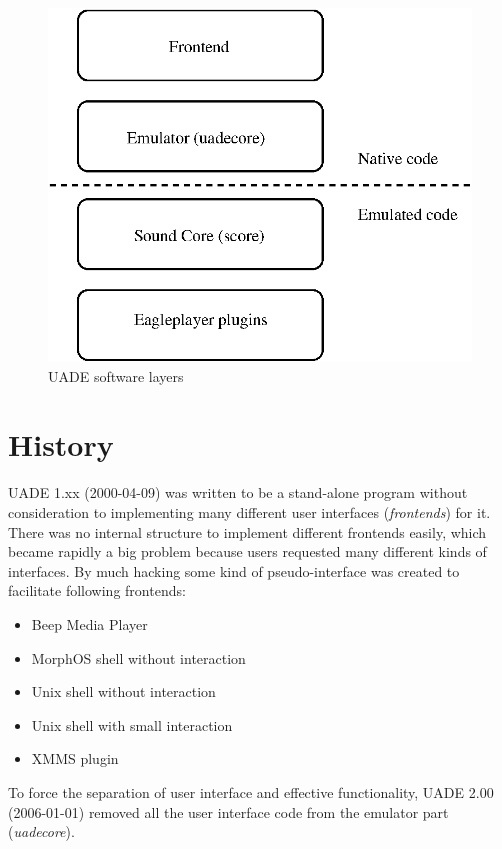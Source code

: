 \documentclass{article}
\begin{document}
\begin{figure}
\centering
\includegraphics[scale=0.5]{layers.eps}
\caption{UADE software layers}
\label{fig:layers}
\end{figure}

\section{History}

UADE 1.xx (2000-04-09) was written to be a stand-alone program without
consideration to implementing many different user interfaces
(\emph{frontends}) for it. There was
no internal structure to implement different frontends easily, which
became rapidly a big problem because users requested many different kinds
of interfaces. By much
hacking some kind of pseudo-interface was created to facilitate following
frontends:
\begin{itemize}
  \item Beep Media Player
  \item MorphOS shell without interaction
  \item Unix shell without interaction
  \item Unix shell with small interaction
  \item XMMS plugin
\end{itemize}

To force the separation of user interface and effective functionality,
UADE 2.00 (2006-01-01) removed all the user interface code from the
emulator part (\emph{uadecore}).
\end{document}
